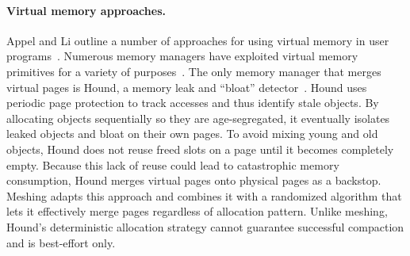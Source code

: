 \paragraph{Virtual memory approaches.}
Appel and Li outline a number of approaches for using virtual memory
in user programs~\cite{Appel:1991:VMP:106972.106984}. Numerous memory
managers have exploited virtual memory primitives for a variety of
purposes~\cite{Novark:2010:DSH:1866307.1866371,1346296,Appel:1988:RCC:53990.53992,Boehm:1991:MPG:113445.113459,Dhurjati:2006:EDD:1135532.1135707,electricfence}. The
only memory manager that merges virtual pages is Hound, a memory leak
and ``bloat'' detector~\cite{1542521}. Hound uses periodic page
protection to track accesses and thus identify stale objects. By
allocating objects sequentially so they are age-segregated, it
eventually isolates leaked objects and bloat on their own pages. To
avoid mixing young and old objects, Hound does not reuse freed slots
on a page until it becomes completely empty. Because this lack of
reuse could lead to catastrophic memory consumption, Hound merges
virtual pages onto physical pages as a backstop. Meshing adapts this
approach and combines it with a randomized algorithm that lets it
effectively merge pages regardless of allocation pattern. Unlike
meshing, Hound's deterministic allocation strategy cannot guarantee
successful compaction and is best-effort only.
